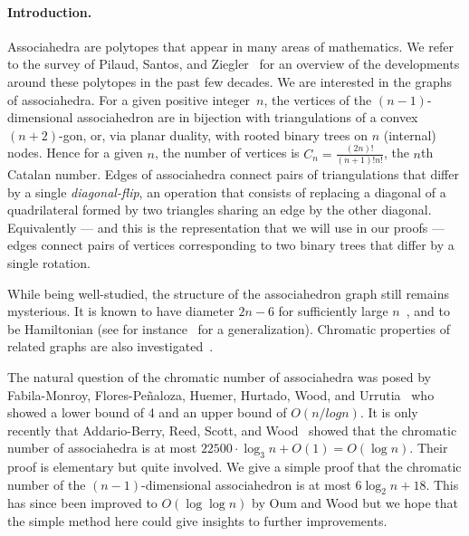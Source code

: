 \documentclass[a4paper]{article}
\begin{document}
\paragraph{Introduction.}
Associahedra are polytopes that appear in many areas of mathematics.
We refer to the survey of Pilaud, Santos, and Ziegler~\cite{MR4675114} for an overview of the developments around these polytopes in the past few decades.
We are interested in the graphs of associahedra.
For a given positive integer~$n$, the vertices of the $(n-1)$-dimensional associahedron are in bijection with triangulations of a convex $(n+2)$-gon, or, via planar duality, with rooted binary trees on $n$ (internal) nodes.
Hence for a given $n$, the number of vertices is $C_n = \frac{(2n)!}{(n+1)!n!}$, the $n$th Catalan number.
Edges of associahedra connect pairs of triangulations that differ by a single
\emph{diagonal-flip}, an operation that consists of 
replacing a diagonal of a quadrilateral
formed by two triangles sharing an edge by the other diagonal. Equivalently
--- and this is the representation that we will use in our proofs ---
edges connect pairs of vertices corresponding to two binary trees that differ by
a single rotation.%

While being well-studied, the structure of the associahedron graph still remains
mysterious. It is known to have diameter $2n-6$ for sufficiently large $n$~\cite{MR4556611,MR3197650}, and
to be Hamiltonian (see for instance~\cite{MR3383157} for a generalization).
Chromatic properties of related graphs are also investigated~\cite{MR4778792,GargantiniPastineEtAl2026,MPZZ25}.

The natural question of the chromatic number of associahedra was posed by Fabila-Monroy, Flores-Pe\~naloza, Huemer, Hurtado, Wood, and Urrutia~\cite{DBLP:journals/dmtcs/MonroyFHHWU09} who showed a lower bound of 4 and an upper bound of $O(n/log n)$.
It is only recently that Addario-Berry, Reed, Scott, and Wood~\cite{Addario-Berry_Reed_Scott_Wood_2026} showed that the chromatic number of associahedra is at most $22500 \cdot \log_3 n + O(1) = O(\log n)$.
Their proof is elementary but quite involved. We give a simple proof that the chromatic
number of the $(n-1)$-dimensional associahedron is at most $6\log_2 n + 18$. This has since been improved to $O(\log \log n)$ \cite{oum2026doublelogarithmicupperboundchromatic} by Oum and Wood but we hope that the simple method here could give insights to further improvements.
\end{document}
